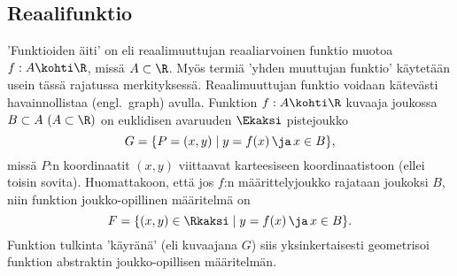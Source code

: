 \subsection{Reaalifunktio}

'Funktioiden äiti' on  eli reaalimuuttujan reaaliarvoinen funktio muotoa
$f: A \kohti \R$, missä $A \subset \R$. Myös termiä 'yhden muuttujan funktio' käytetään usein 
tässä rajatussa merkityksessä. Reaalimuuttujan funktio voidaan kätevästi havainnollistaa
%
 (engl.\ graph) avulla. Funktion $f: A \kohti \R$ kuvaaja joukossa
$B \subset A\ (A\subset\R)$ on euklidisen avaruuden $\Ekaksi$ pistejoukko
\[ 
G = \{P = (x,y) \mid y = f(x)\,\ja\, x \in B\},
\]
missä $P$:n koordinaatit $(x,y)$ viittaavat karteesiseen koordinaatistoon (ellei toisin sovita).
Huomattakoon, että jos $f$:n määrittelyjoukko rajataan joukoksi $B$, niin funktion
joukko-opillinen määritelmä on
\[ 
F = \{(x,y)\in\Rkaksi \mid y = f(x)\,\ja\, x \in B\}.
\]
Funktion tulkinta 'käyränä' (eli kuvaajana $G$) siis yksinkertaisesti geometrisoi funktion
abstraktin joukko-opillisen määritelmän.

